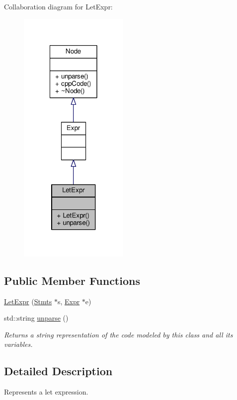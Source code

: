 Collaboration diagram for Let\-Expr\-:\nopagebreak
\begin{figure}[H]
\begin{center}
\leavevmode
\includegraphics[width=150pt]{classLetExpr__coll__graph}
\end{center}
\end{figure}
\subsection*{Public Member Functions}
\begin{DoxyCompactItemize}
\item 
\hyperlink{classLetExpr_aeed5f20120434ad46cdb0ddca148603b}{Let\-Expr} (\hyperlink{classStmts}{Stmts} $\ast$s, \hyperlink{classExpr}{Expr} $\ast$e)
\item 
std\-::string \hyperlink{classLetExpr_a518a538c87aeec36204d8a465be32913}{unparse} ()
\begin{DoxyCompactList}\small\item\em Returns a string representation of the code modeled by this class and all its variables. \end{DoxyCompactList}\end{DoxyCompactItemize}


\subsection{Detailed Description}
Represents a let expression. \par
 

